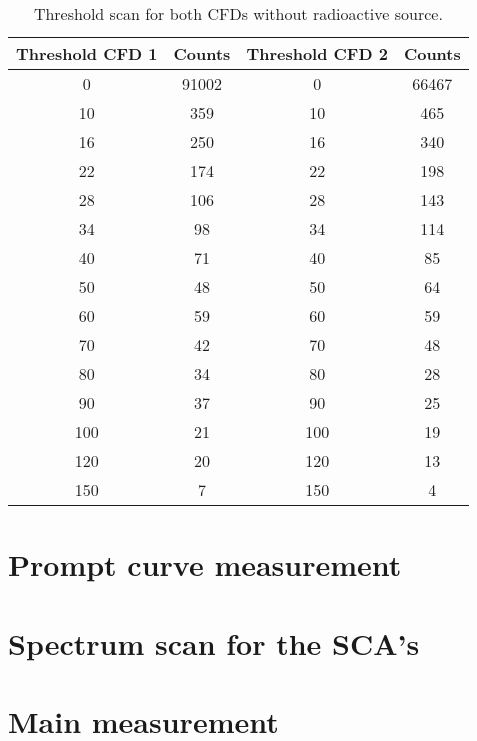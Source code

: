 \documentclass[11pt,a4paper,notitlepage]{scrartcl}
\begin{document}
\begin{table}[htbp]
	\centering
	\begin{tabular}{cccc}
		\toprule
			Threshold CFD 1 & Counts  & Threshold CFD 2 & Counts \\
			\hline
		0           & 91002        & 0           & 66467        \\
		10          & 359          & 10          & 465          \\
		16          & 250          & 16          & 340          \\
		22          & 174          & 22          & 198          \\
		28          & 106          & 28          & 143          \\
		34          & 98           & 34          & 114          \\
		40          & 71           & 40          & 85           \\
		50          & 48           & 50          & 64           \\
		60          & 59           & 60          & 59           \\
		70          & 42           & 70          & 48           \\
		80          & 34           & 80          & 28           \\
		90          & 37           & 90          & 25           \\
		100         & 21           & 100         & 19           \\
		120         & 20           & 120         & 13           \\
		150         & 7            & 150         & 4    \\
		\bottomrule
	\end{tabular}
\caption{Threshold scan for both CFDs without radioactive source.}
\end{table}
       
\section*{Prompt curve measurement}

\section*{Spectrum scan for the SCA's}

\section*{Main measurement}
\end{document}
